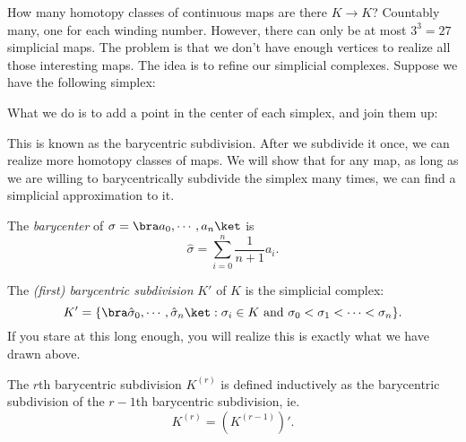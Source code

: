 \documentclass[a4paper]{article}
\begin{document}
How many homotopy classes of continuous maps are there $K \to K$? Countably many, one for each winding number. However, there can only be at most $3^3 = 27$ simplicial maps. The problem is that we don't have enough vertices to realize all those interesting maps. The idea is to refine our simplicial complexes. Suppose we have the following simplex:
\begin{center}
\end{center}
What we do is to add a point in the center of each simplex, and join them up:
\begin{center}
\end{center}
This is known as the barycentric subdivision. After we subdivide it once, we can realize more homotopy classes of maps. We will show that for any map, as long as we are willing to barycentrically subdivide the simplex many times, we can find a simplicial approximation to it.

\begin{defi}[Barycenter]
  The \emph{barycenter} of $\sigma = \bra a_0, \cdots, a_n\ket$ is
  \[
    \hat{\sigma} = \sum_{i = 0}^n \frac{1}{n + 1} a_i.
  \]
\end{defi}

\begin{defi}
  The \emph{(first) barycentric subdivision} $K'$ of $K$ is the simplicial complex:
  \[
    K' = \{\bra \hat{\sigma}_0, \cdots, \hat{\sigma}_n\ket: \sigma_i \in K\text{ and }\sigma_0 < \sigma_1 < \cdots < \sigma_n\}.
  \]
  If you stare at this long enough, you will realize this is exactly what we have drawn above.

  The $r$th barycentric subdivision $K^{(r)}$ is defined inductively as the barycentric subdivision of the $r - 1$th barycentric subdivision, ie.
  \[
    K^{(r)} = (K^{(r - 1)})'.
  \]
\end{defi}
\end{document}
